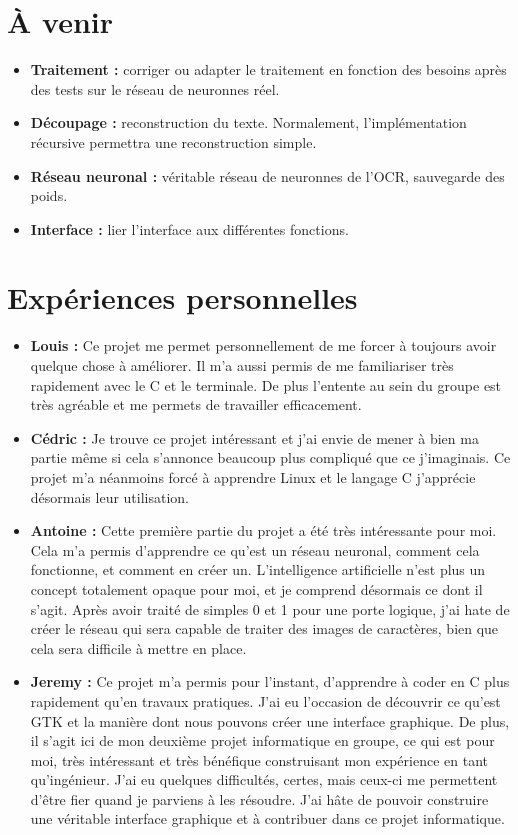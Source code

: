\documentclass[12pt]{report}
\begin{document}
\chapter{À venir}

\begin{itemize}
	\item \textbf{Traitement :} corriger ou adapter le traitement en fonction des besoins après des tests sur le réseau de neuronnes réel.
	\item \textbf{Découpage :} reconstruction du texte. Normalement, l'implémentation récursive permettra une reconstruction simple.
	\item \textbf{Réseau neuronal :} véritable réseau de neuronnes de l'OCR, sauvegarde des poids.
	\item \textbf{Interface :} lier l'interface aux différentes fonctions.
\end{itemize}

\chapter{Expériences personnelles}

\begin{itemize}
	\item \textbf{Louis :} Ce projet me permet personnellement de me forcer à toujours avoir quelque chose à améliorer. Il m’a aussi permis de me familiariser très rapidement avec le C et le terminale. De plus l’entente au sein du groupe est très agréable et me permets de travailler efficacement.
	\item \textbf{Cédric :} Je trouve ce projet intéressant et j'ai envie de mener à bien ma partie même si cela s'annonce beaucoup plus compliqué que ce j'imaginais. Ce projet m'a néanmoins forcé à apprendre Linux et le langage C j'apprécie désormais leur utilisation.
	\item \textbf{Antoine :} Cette première partie du projet a été très intéressante pour moi. Cela m'a permis d'apprendre ce qu'est un réseau neuronal, comment cela fonctionne, et comment en créer un. L'intelligence artificielle n'est plus un concept totalement opaque pour moi, et je comprend désormais ce dont il s'agit. Après avoir traité de simples 0 et 1 pour une porte logique, j'ai hate de créer le réseau qui sera capable de traiter des images de caractères, bien que cela sera difficile à mettre en place.
	\item \textbf{Jeremy :} Ce projet m’a permis pour l’instant, d’apprendre à coder en C plus rapidement qu’en travaux pratiques. J’ai eu l’occasion de découvrir ce qu’est GTK et la manière dont nous pouvons créer une interface graphique. De plus, il s’agit ici de mon deuxième projet informatique en groupe, ce qui est pour moi, très intéressant et très bénéfique construisant mon expérience en tant qu’ingénieur. J’ai eu quelques difficultés, certes, mais ceux-ci me permettent d’être fier quand je parviens à les résoudre. J’ai hâte de pouvoir construire une véritable interface graphique et à contribuer dans ce projet informatique.
\end{itemize}
\end{document}
